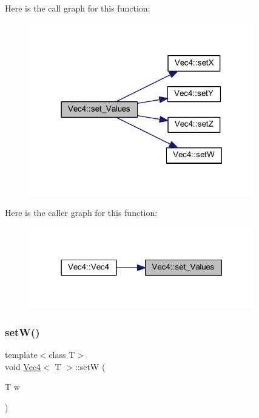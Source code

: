 Here is the call graph for this function\+:
\nopagebreak
\begin{figure}[H]
\begin{center}
\leavevmode
\includegraphics[width=278pt]{class_vec4_a4c670bb938d2274701f7d5764ac68fb8_cgraph}
\end{center}
\end{figure}
Here is the caller graph for this function\+:
\nopagebreak
\begin{figure}[H]
\begin{center}
\leavevmode
\includegraphics[width=278pt]{class_vec4_a4c670bb938d2274701f7d5764ac68fb8_icgraph}
\end{center}
\end{figure}
\mbox{\label{class_vec4_ad347e47a5371a8663d6b19c3bfaf4154}} 
\subsubsection{\texorpdfstring{setW()}{setW()}}
{\footnotesize\ttfamily template$<$class T$>$ \\
void \mbox{\hyperlink{class_vec4}{Vec4}}$<$ T $>$\+::setW (\begin{DoxyParamCaption}\item[{T}]{w }\end{DoxyParamCaption})\hspace{0.3cm}{\ttfamily [inline]}}



